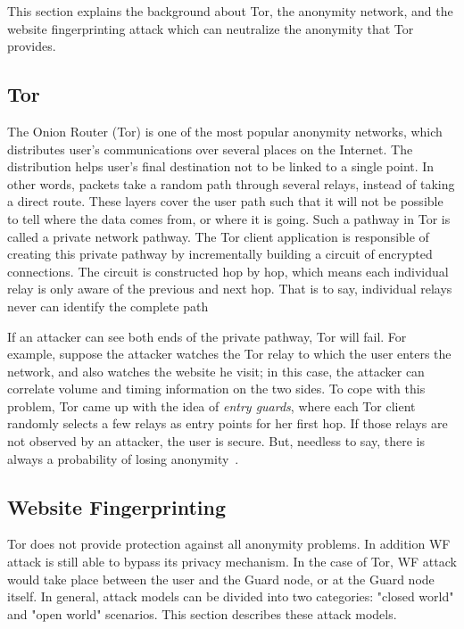  
This section explains the background about Tor, the anonymity network, and the website fingerprinting attack which can neutralize the anonymity that Tor provides.

\subsection{Tor}

The Onion Router (Tor) is one of the most popular anonymity networks, which distributes user's communications over several places on the Internet.
The distribution helps user's final destination not to be linked to a single point.
In other words, packets take a random path through several relays, instead of taking a direct route.
These layers cover the user path such that it will not be possible to tell where the data comes from, or where it is going.
Such a pathway in Tor is called a private network pathway.
The Tor client application is responsible of creating this private pathway by incrementally building a circuit of encrypted connections.
The circuit is constructed hop by hop, which means each individual relay is only aware of the previous and next hop.
That is to say, individual relays never can identify the complete path \cite{TorPage, dingledine2004tor}

If an attacker can see both ends of the private pathway, Tor will fail.
For example, suppose the attacker watches the Tor relay to which the user enters the network, and also watches the website he visit; in this case, the attacker can correlate volume and timing information on the two sides.
To cope with this problem, Tor came up with the idea of {\it entry guards}, where each Tor client randomly selects a few relays as entry points for her first hop.
If those relays are not observed by an attacker, the user is secure.
But, needless to say, there is always a probability of losing anonymity~\cite{TorPage}.

\subsection{Website Fingerprinting}

Tor does not provide protection against all anonymity problems. In addition WF attack is still able to bypass its privacy mechanism. In the case of Tor, WF attack would take place between the user and the Guard node, or at the Guard node itself. In general, attack models can be divided into two categories: "closed world" and "open world" scenarios.  This section describes these attack models.


